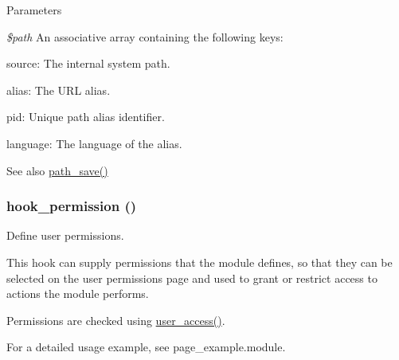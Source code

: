 \begin{DoxyParams}{Parameters}
\item[{\em \$path}]An associative array containing the following keys:
\begin{DoxyItemize}
\item source: The internal system path.
\item alias: The URL alias.
\item pid: Unique path alias identifier.
\item language: The language of the alias.
\end{DoxyItemize}\end{DoxyParams}
\begin{DoxySeeAlso}{See also}
\hyperlink{path_8inc_a2560e9e01e6d4f6b38c4e55c39715e25}{path\_\-save()} 
\end{DoxySeeAlso}
\hypertarget{group__hooks_ga2b22b45f4925f2478412477bae329713}{
\subsubsection[{hook\_\-permission}]{\setlength{\rightskip}{0pt plus 5cm}hook\_\-permission ()}}
\label{group__hooks_ga2b22b45f4925f2478412477bae329713}
Define user permissions.

This hook can supply permissions that the module defines, so that they can be selected on the user permissions page and used to grant or restrict access to actions the module performs.

Permissions are checked using \hyperlink{user_8module_a8daa9d898b1e84225b519ee0c7fb57e0}{user\_\-access()}.

For a detailed usage example, see page\_\-example.module.

